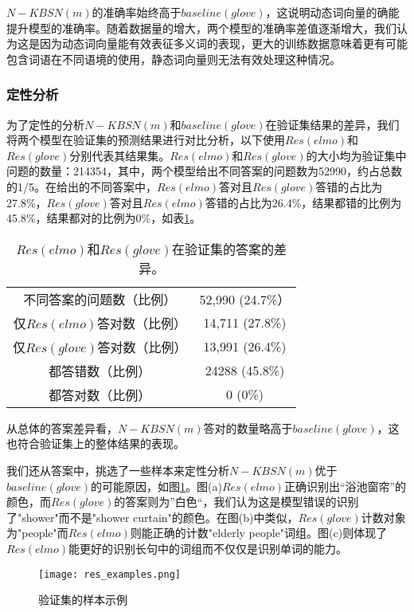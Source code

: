 $N-KBSN(m)$的准确率始终高于$baseline(glove)$，这说明动态词向量的确能提升模型的准确率。随着数据量的增大，两个模型的准确率差值逐渐增大，我们认为这是因为动态词向量能有效表征多义词的表现，更大的训练数据意味着更有可能包含词语在不同语境的使用，静态词向量则无法有效处理这种情况。

\subsubsection{定性分析}
为了定性的分析$N-KBSN(m)$和$baseline(glove)$在验证集结果的差异，我们将两个模型在验证集的预测结果进行对比分析，以下使用$Res(elmo)$和$Res(glove)$分别代表其结果集。$Res(elmo)$和$Res(glove)$的大小均为验证集中问题的数量：214354，其中，两个模型给出不同答案的问题数为52990，约占总数的1/5。在给出的不同答案中，$Res(elmo)$答对且$Res(glove)$答错的占比为27.8\%，$Res(glove)$答对且$Res(elmo)$答错的占比为26.4\%，结果都错的比例为45.8\%，结果都对的比例为0\%，如表\ref{diff}。
\begin{table}[H]
\centering
\caption{$Res(elmo)$和$Res(glove)$在验证集的答案的差异。}
\begin{tabular}{cc}
\toprule
不同答案的问题数（比例） & 52,990 (24.7\%）\\
仅$Res(elmo)$答对数（比例） & 14,711 (27.8\%)\\
仅$Res(glove)$答对数（比例） & 13,991 (26.4\%)\\
都答错数（比例）& 24288 (45.8\%)\\
都答对数（比例）& 0 (0\%) \\
\bottomrule
\end{tabular}
\label{diff}
\end{table}
从总体的答案差异看，$N-KBSN(m)$答对的数量略高于$baseline(glove)$，这也符合验证集上的整体结果的表现。

我们还从答案中，挑选了一些样本来定性分析$N-KBSN(m)$优于$baseline(glove)$的可能原因，如图\ref{res_examples}。图(a)$Res(elmo)$正确识别出“浴池窗帘”的颜色，而$Res(glove)$的答案则为”白色“，我们认为这是模型错误的识别了"shower"而不是"shower curtain"的颜色。在图(b)中类似，$Res(glove)$计数对象为"people"而$Res(elmo)$则能正确的计数"elderly people"词组。图(c)则体现了$Res(elmo)$能更好的识别长句中的词组而不仅仅是识别单词的能力。
\begin{figure}[H]
	\texttt{[image: res\_examples.png]}
	\caption{验证集的样本示例}
	\label{res_examples}
\end{figure}

